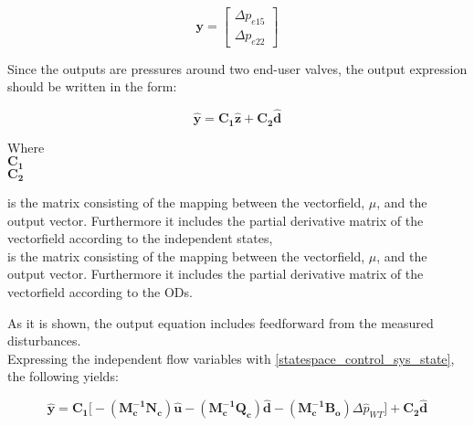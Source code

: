 \begin{equation}
\pmb{y} =
\begin{bmatrix} 
\Delta p_{e15} \\
\Delta p_{e22} 
\label{outputvector_control}
\end{bmatrix} 
\end{equation}

Since the outputs are pressures around two end-user valves, the output expression should be written in the form:

\begin{equation}
  \pmb{\hat{y}} = \pmb{C_1} \pmb{\hat{z}} + \pmb{C_2} \pmb{\hat{d}}  
   \label{statespace_control_output}
\end{equation}

\begin{minipage}[t]{0.20\textwidth}
Where\\
\hspace*{8mm} $\pmb{C_1}$ \\
\newline
\newline
\newline
\hspace*{8mm} $\pmb{C_2}$ 
\end{minipage}
\begin{minipage}[t]{0.68\textwidth}
\vspace*{2mm}
is the matrix consisting of the mapping between the vectorfield, $\mu$, and the output vector. Furthermore it includes the partial derivative matrix of the vectorfield according to the independent states, \\
is the matrix consisting of the mapping between the vectorfield, $\mu$, and the output vector. Furthermore it includes the partial derivative matrix of the vectorfield according to the ODs.
\end{minipage}

As it is shown, the output equation includes feedforward from the measured disturbances. 
\\
Expressing the independent flow variables with \eqref{statespace_control_sys_state}, the following yields: 

\begin{equation}
  \pmb{\hat{y}} = \pmb{C_1} \big[- (\pmb{M_c^{-1}}\pmb{N_c}) \pmb{\hat{u}} - (\pmb{M_c^{-1}}\pmb{Q_c}) \pmb{\hat{d}} - (\pmb{M_c^{-1}}\pmb{B_o}) \Delta \hat{p}_{WT}\big] + \pmb{C_2} \pmb{\hat{d}}  
   \label{statespace_control_output}
\end{equation}

